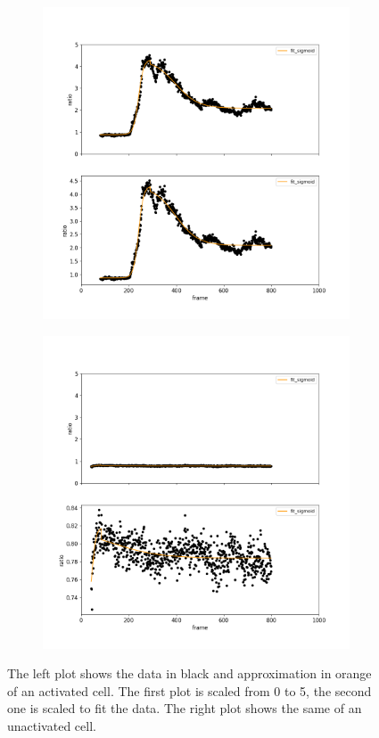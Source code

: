 \begin{figure}[h]
	\centering
	\begin{subfigure}{0.45\linewidth}
		\includegraphics[width=\textwidth]{fig/particle_vis_sigmoid_approx_pos}
	\end{subfigure}
	\hfill
	\begin{subfigure}{0.45\linewidth}
		\includegraphics[width=\textwidth]{fig/particle_vis_sigmoid_approx_neg}
	\end{subfigure}
	
	\caption{The left plot shows the data in black and approximation in orange of an activated cell. The first plot is scaled from 0 to 5, the second one is scaled to fit the data. The right plot shows the same of an unactivated cell.}
	\label{fig:particle_vis_sigmoid_approx}
\end{figure}


